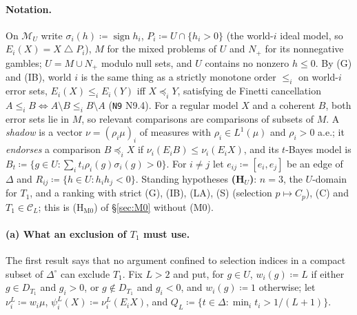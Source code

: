 \documentclass[11pt]{article}
\theoremstyle{definition}
\theoremstyle{remark}
\newcommand{\Di}{\Delta^{\circ}}
\newcommand{\M}{\mathcal M}
\newcommand{\C}{\mathcal C}
\newcommand{\sd}{\mathbin{\triangle}}
\newcommand{\src}[1]{\texttt{#1}}
\begin{document}
\paragraph{Notation.} On $\M_U$ write $\sigma_i(h)\coloneqq\operatorname{sign}h_i$, $P_i\coloneqq U\cap\{h_i>0\}$ (the world-$i$ ideal model, so $E_i(X)=X\sd P_i$), $M$ for the mixed problems of $U$ and $N_+$ for its nonnegative gambles; $U=M\cup N_+$ modulo null sets, and $U$ contains no nonzero $h\le0$. By (G) and (IB), world $i$ is the same thing as a strictly monotone order $\le_i$ on world-$i$ error sets, $E_i(X)\le_iE_i(Y)$ iff $X\preceq_iY$, satisfying de Finetti cancellation $A\le_iB\iff A\setminus B\le_iB\setminus A$ (\src{N9} N9.4). For a regular model $X$ and a coherent $B$, both error sets lie in $M$, so relevant comparisons are comparisons of subsets of $M$. A \emph{shadow} is a vector $\nu=(\rho_i\mu)_i$ of measures with $\rho_i\in L^1(\mu)$ and $\rho_i>0$ a.e.; it \emph{endorses} a comparison $B\preceq_iX$ if $\nu_i(E_iB)\le\nu_i(E_iX)$, and its $t$-Bayes model is $B_t\coloneqq\{g\in U:\sum_it_i\rho_i(g)\sigma_i(g)>0\}$. For $i\ne j$ let $e_{ij}\coloneqq[e_i,e_j]$ be an edge of $\Delta$ and $R_{ij}\coloneqq\{h\in U:h_ih_j<0\}$. Standing hypotheses \textbf{(H$_U$)}: $n=3$, the $U$-domain for $T_1$, and a ranking with strict (G), (IB), (LA), (S) (selection $p\mapsto C_p$), (C) and $T_1\in\C_L$; this is (H$_{\mathrm{M0}}$) of \S\ref{sec:M0} without (M0).

\paragraph{(a) What an exclusion of $T_1$ must use.} The first result says that no argument confined to selection indices in a compact subset of $\Di$ can exclude $T_1$. Fix $L>2$ and put, for $g\in U$, $w_i(g)\coloneqq L$ if either $g\in D_{T_1}$ and $g_i>0$, or $g\notin D_{T_1}$ and $g_i<0$, and $w_i(g)\coloneqq1$ otherwise; let $\nu^L_i\coloneqq w_i\mu$, $\psi^L_i(X)\coloneqq\nu^L_i(E_iX)$, and $Q_L\coloneqq\{t\in\Delta:\min_it_i>1/(L+1)\}$.
\end{document}
